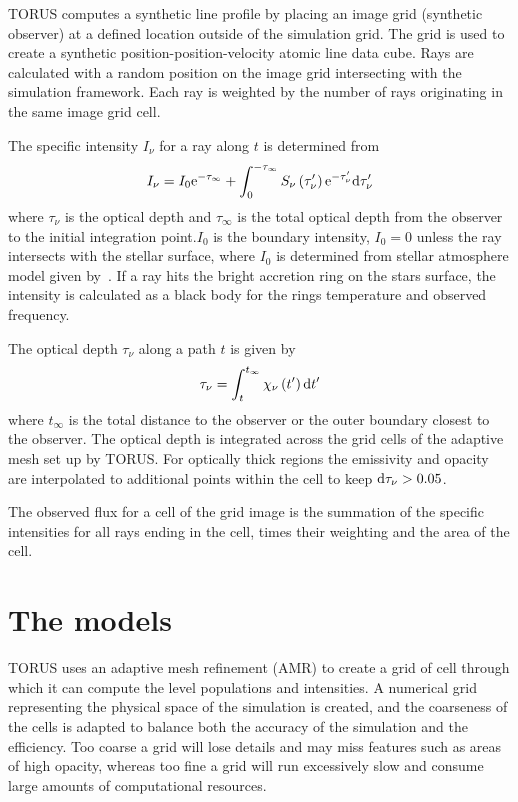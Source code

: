 \documentclass[fleqn,usenatbib]{mnras}
\begin{document}
TORUS computes a synthetic line profile by placing an image grid (synthetic observer) at a defined location outside of the simulation grid. The grid is used to create a synthetic position-position-velocity atomic line data cube. Rays are calculated with a random position on the image grid intersecting with the simulation framework. Each ray is weighted by the number of rays originating in the same image grid cell.

The specific intensity $I_{\nu}$ for a ray along $t$ is determined from
\begin{equation}
I_{\nu} = I_{0}{\rm e}^{-\tau_{\infty}} + \int^{-\tau_{\infty}}_{0}S_{\nu}\left(\tau_{\nu}'\right){\rm e}^{-\tau_{\nu}'}{\rm d}\tau_{\nu}'
\end{equation}
where $\tau_{\nu}$ is the optical depth and $\tau_{\infty}$ is the total optical depth from the observer to the initial integration point.$I_0$ is the boundary intensity, $I_0=0$ unless the ray intersects with the stellar surface, where $I_0$ is determined from stellar atmosphere model given by~\citet{1979ApJS...40....1K}. If a ray hits the bright accretion ring on the stars surface, the intensity is calculated as a black body for the rings temperature and observed frequency.

The optical depth $\tau_{\nu}$ along a path $t$ is given by
\begin{equation}
    \tau_{\nu} = \int_{t}^{t_{\infty}} \chi_{\nu}\left(t' \right){\rm d}t'
\end{equation}
where $t_{\infty}$ is the total distance to the observer or the outer boundary closest to the observer. The optical depth is integrated across the grid cells of the adaptive mesh set up by TORUS. For optically thick regions the emissivity and opacity are interpolated to additional points within the cell to keep ${\rm d}\tau_{\nu} > 0.05$. 

The observed flux for a cell of the grid image is the summation of the specific intensities for all rays ending in the cell, times their weighting and the area of the cell.

\section{The models}
\label{sec:model}

TORUS uses an adaptive mesh refinement (AMR) to create a grid of cell through which it can compute the level populations and intensities.  A numerical grid representing the physical space of the simulation is created, and the coarseness of the cells is adapted to balance both the accuracy of the simulation and the efficiency. Too coarse a grid will lose details and may miss features such as areas of high opacity, whereas too fine a grid will run excessively slow and consume large amounts of computational resources.
\end{document}
